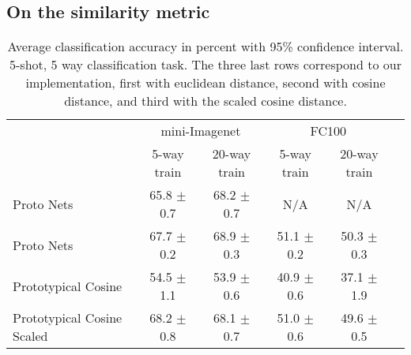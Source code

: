 \documentclass{article}
\begin{document}
\subsection{On the similarity metric}\label{ssec:cosine_distance}

\begin{table}[t]
    \centering
    \caption{Average classification accuracy in percent with 95\% confidence interval. 5-shot, 5 way classification task. The three last rows correspond to our implementation, first with euclidean distance, second with cosine distance, and third with the scaled cosine distance.}
    \label{table:cosine_vs_euclidian}
    \begin{tabular}{lccccr} 
        \toprule
         & \multicolumn{2}{c}{mini-Imagenet}  & \multicolumn{2}{c}{FC100} &  \\ 
         & 5-way train    &  20-way train   & 5-way train &  20-way train  \\ 
        \hline
        Proto Nets \cite{snell2017prototypical} & 65.8 $\pm$ 0.7 & 68.2 $\pm$ 0.7 & {N/A}  & {N/A} \\
        \hline
        Proto Nets & 67.7 $\pm$ 0.2 & 68.9 $\pm$ 0.3 & 51.1 $\pm$ 0.2  & 50.3 $\pm$ 0.3  \\
        Prototypical Cosine & 54.5 $\pm$ 1.1   & 53.9 $\pm$ 0.6   & 40.9 $\pm$ 0.6   & 37.1 $\pm$ 1.9 \\ 
        Prototypical Cosine Scaled &  68.2 $\pm$ 0.8  & 68.1 $\pm$ 0.7  & 51.0 $\pm$ 0.6  & 49.6 $\pm$ 0.5 \\  
        \bottomrule
    \end{tabular}
\end{table}
\end{document}
